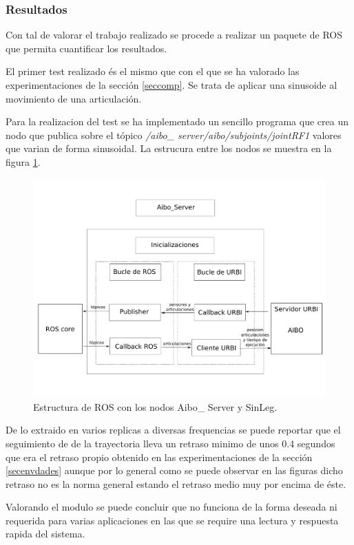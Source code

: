 \documentclass[12pt,a4paper,final,twoside]{article}
\begin{document}
\subsubsection{Resultados}
Con tal de valorar el trabajo realizado se procede a realizar un paquete de ROS que permita cuantificar los resultados.

El primer test realizado és el mismo que con el que se ha valorado las experimentaciones de la sección \ref{seccomp}. Se trata de aplicar una sinusoide al movimiento de una articulación.

Para la realizacion del test se ha implementado un sencillo programa que crea un nodo que publica sobre el tópico \textit{/aibo\_ server/aibo/subjoints/jointRF1} 	valores que varian de forma sinusoidal. 
La estrucura entre los nodos se muestra en la figura \ref{fig:ASSL}.
\begin{figure}[H]
	\centering
    \includegraphics[scale=0.35]{images/Aibo_Server.pdf}%
	 \caption{Estructura de ROS con los nodos Aibo\_ Server y SinLeg.}
  \label{fig:ASSL}
\end{figure}

De lo extraido en varios replicas a diversas frequencias se puede reportar que el seguimiento de de la trayectoria lleva un retraso minimo de unos 0.4 segundos que era el retraso propio obtenido en las experimentaciones de la sección \ref{secenvdades} aunque por lo general como se puede observar en las figuras %
dicho retraso no es la norma general estando el retraso medio muy por encima de éste.

Valorando el modulo se puede concluir que no funciona de la forma deseada ni requerida para varias aplicaciones en las que se require una lectura y respuesta rapida del sistema.
\end{document}
